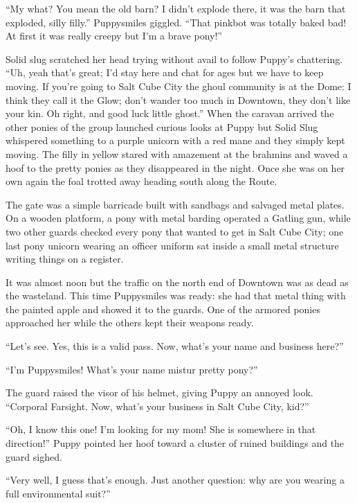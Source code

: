 ``My what? You mean the old barn? I didn't explode there, it was the barn that exploded, silly filly.'' Puppysmiles giggled. ``That pinkbot was totally baked bad! At first it was really creepy but I'm a brave pony!''

Solid slug scratched her head trying without avail to follow Puppy's chattering. ``Uh, yeah that's great; I'd stay here and chat for ages but we have to keep moving. If you're going to Salt Cube City the ghoul community is at the Dome: I think they call it the Glow; don't wander too much in Downtown, they don't like your kin. Oh right, and good luck little ghost.'' When the caravan arrived the other ponies of the group launched curious looks at Puppy but Solid Slug whispered something to a purple unicorn with a red mane and they simply kept moving. The filly in yellow stared with amazement at the brahmins and waved a hoof to the pretty ponies as they disappeared in the night. Once she was on her own again the foal trotted away heading south along the Route.

\horizonline


The gate was a simple barricade built with sandbags and salvaged metal plates. On a wooden platform, a pony with metal barding operated a Gatling gun, while two other guards checked every pony that wanted to get in Salt Cube City; one last pony unicorn wearing an officer uniform sat inside a small metal structure writing things on a register.

It was almost noon but the traffic on the north end of Downtown was as dead as the wasteland. This time Puppysmiles was ready: she had that metal thing with the painted apple and showed it to the guards. One of the armored ponies approached her while the others kept their weapons ready.

``Let's see. Yes, this is a valid pass. Now, what's your name and business here?''

``I'm Puppysmiles! What's your name mistur pretty pony?''

The guard raised the visor of his helmet, giving Puppy an annoyed look. ``Corporal Farsight. Now, what's your business in Salt Cube City, kid?''

``Oh, I know this one! I'm looking for my mom! She is somewhere in that direction!'' Puppy pointed her hoof toward a cluster of ruined buildings and the guard sighed.

``Very well, I guess that's enough. Just another question: why are you wearing a full environmental suit?''


